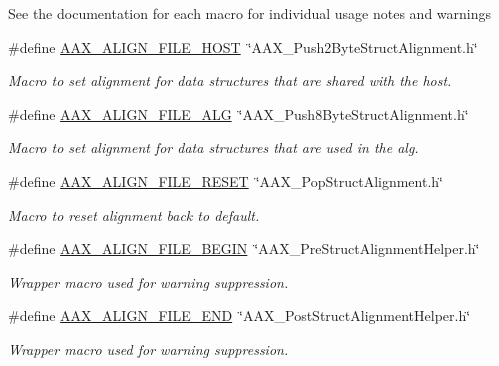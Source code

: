 \begin{Indent}
{See the documentation for each macro for individual usage notes and warnings }\begin{DoxyCompactItemize}
\item 
\#define \mbox{\hyperlink{a00392_acbef7ed7d077bc9812cb56417e1ad325}{A\+A\+X\+\_\+\+A\+L\+I\+G\+N\+\_\+\+F\+I\+L\+E\+\_\+\+H\+O\+ST}}~\char`\"{}A\+A\+X\+\_\+\+Push2\+Byte\+Struct\+Alignment.\+h\char`\"{}
\begin{DoxyCompactList}\small\item\em Macro to set alignment for data structures that are shared with the host. \end{DoxyCompactList}\item 
\#define \mbox{\hyperlink{a00392_a8fbeac3c5db5ac694e85a021ed74dc9e}{A\+A\+X\+\_\+\+A\+L\+I\+G\+N\+\_\+\+F\+I\+L\+E\+\_\+\+A\+LG}}~\char`\"{}A\+A\+X\+\_\+\+Push8\+Byte\+Struct\+Alignment.\+h\char`\"{}
\begin{DoxyCompactList}\small\item\em Macro to set alignment for data structures that are used in the alg. \end{DoxyCompactList}\item 
\#define \mbox{\hyperlink{a00392_a8aaaefcc3d87025e84d5ccb99b650a87}{A\+A\+X\+\_\+\+A\+L\+I\+G\+N\+\_\+\+F\+I\+L\+E\+\_\+\+R\+E\+S\+ET}}~\char`\"{}A\+A\+X\+\_\+\+Pop\+Struct\+Alignment.\+h\char`\"{}
\begin{DoxyCompactList}\small\item\em Macro to reset alignment back to default. \end{DoxyCompactList}\item 
\#define \mbox{\hyperlink{a00392_adda336497ac4b6d43d00b27c6d8f4b0c}{A\+A\+X\+\_\+\+A\+L\+I\+G\+N\+\_\+\+F\+I\+L\+E\+\_\+\+B\+E\+G\+IN}}~\char`\"{}A\+A\+X\+\_\+\+Pre\+Struct\+Alignment\+Helper.\+h\char`\"{}
\begin{DoxyCompactList}\small\item\em Wrapper macro used for warning suppression. \end{DoxyCompactList}\item 
\#define \mbox{\hyperlink{a00392_a4343a2f7a4030576d290bc2c127964d8}{A\+A\+X\+\_\+\+A\+L\+I\+G\+N\+\_\+\+F\+I\+L\+E\+\_\+\+E\+ND}}~\char`\"{}A\+A\+X\+\_\+\+Post\+Struct\+Alignment\+Helper.\+h\char`\"{}
\begin{DoxyCompactList}\small\item\em Wrapper macro used for warning suppression. \end{DoxyCompactList}\end{DoxyCompactItemize}
\end{Indent}
